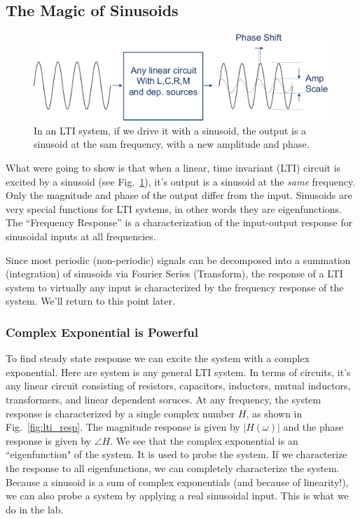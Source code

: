 
\subsection{The Magic of Sinusoids}

\begin{figure}[tb]
\begin{center}
\includegraphics[width=.75\columnwidth]{lti_sine}
\end{center}
\caption{In an LTI system, if we drive it with a sinusoid, the output is a sinusoid at the sam frequency, with a new amplitude and phase. } \label{fig:lti_sine}
\end{figure}

What were going to show is that when a linear, time invariant (LTI) circuit is excited by a sinusoid (see Fig.~\ref{fig:lti_sine}), it's output is a sinusoid at the \emph{same} frequency.  Only the magnitude and phase of the output differ from the input.  Sinusoids are very special functions for LTI systems, in other words they are eigenfunctions.  The ``Frequency Response'' is a characterization of the input-output response for sinusoidal inputs at all frequencies.

Since most periodic (non-periodic) signals can be decomposed into a summation (integration) of sinusoids via Fourier Series (Transform), the response of a LTI system to virtually any input is characterized by the frequency response of the system.  We'll return to this point later.

\subsubsection{Complex Exponential is Powerful}

To find steady state response we can excite the system with a complex exponential.   Here are system is any general LTI system. In terms of circuits, it's any linear circuit consisting of resistors, capacitors, inductors, mutual inductors, transformers, and linear dependent soruces.  At any frequency, the system response is characterized by a single complex number $H$, as shown in Fig.~\ref{fig:lti_resp}.   The magnitude response is given by $|H(\omega)|$ and
the phase response is given by $\angle H$.   We see that the complex exponential is an ``eigenfunction" of the system.  It is used to probe the system.  If we characterize the response to all eigenfunctions, we can completely characterize the system.   Because a sinusoid is a sum of complex exponentials (and because of linearity!), we can also probe a system by applying a real sinusoidal input.  This is what we do in the lab.


